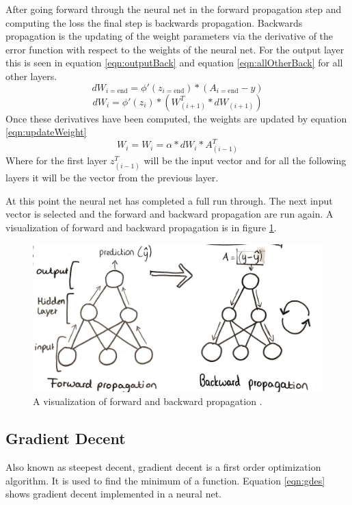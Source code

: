 \documentclass[12pt]{article}
\begin{document}
	After going forward through the neural net in the forward propagation step and computing the loss the final step is backwards propagation. Backwards propagation is the updating of the weight parameters via the derivative of the error function with respect to the weights of the neural net. For the output layer this is seen in equation \ref{eqn:outputBack} and equation \ref{eqn:allOtherBack} for all other layers.
	\begin{equation}
	dW_{i=\text{end}}=\phi'(z_{i=\text{end}})*\left(A_{i=\text{end}}-y\right)
	\label{eqn:outputBack}
	\end{equation}
	\begin{equation}
	dW_i=\phi'(z_i)*\left(W_{\left(i+1\right)}^T*dW_{\left(i+1\right)}\right)
	\label{eqn:allOtherBack}
	\end{equation}
	Once these derivatives have been computed, the weights are updated by equation \ref{eqn:updateWeight}
	\begin{equation}
	W_i = W_i=\alpha*dW_{i}*A_{\left(i-1\right)}^T
	\label{eqn:updateWeight}
	\end{equation}
	Where for the first layer $z_{\left(i-1\right)}^T$ will be the input vector and for all the following layers it will be the vector from the previous layer. \par 
	At this point the neural net has completed a full run through. The next input vector is selected and the forward and backward propagation are run again. A visualization of forward and backward propagation is in figure \ref{fig:forwardbackwardprop}.
	
	\begin{figure}
		\centering
		\includegraphics[width=0.7\linewidth]{forwardBackwardProp}
		\caption{A visualization of forward and backward propagation \cite{nnBlog}.}
		\label{fig:forwardbackwardprop}
	\end{figure}
	\subsection{Gradient Decent}
	Also known as steepest decent, gradient decent is a first order optimization algorithm. It is used to find the minimum of a function. Equation \ref{eqn:gdes} shows gradient decent implemented in a neural net. 
	
\end{document}
